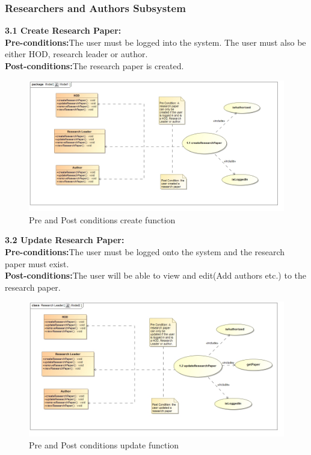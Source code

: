 \documentclass{article}
\begin{document}
			\subsubsection{Researchers and Authors Subsystem}
				\indent \textbf{3.1 Create Research Paper:}\\
					\indent \indent \textbf{Pre-conditions:}The user must be logged into the system. The user must also be either HOD, research leader or author.\\
					\indent \indent \textbf{Post-conditions:}The research paper is created.\\
					\begin{figure}
						\includegraphics[width=\textwidth]{createResearchPaper}
						\caption{Pre and Post conditions create function}
					\end{figure}
				\indent \textbf{3.2 Update Research Paper:}\\
					\indent \indent \textbf{Pre-conditions:}The user must be logged onto the system and the research paper must exist.\\
					\indent \indent \textbf{Post-conditions:}The user will be able to view and edit(Add authors etc.) to the research paper.\\
					\begin{figure}
						\includegraphics[width=\textwidth]{updatePAper}
						\caption{Pre and Post conditions update function}
					\end{figure}
\end{document}

